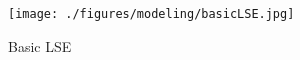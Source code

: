\begin{figure}[ht!]
\texttt{[image: ./figures/modeling/basicLSE.jpg]}
\centering
\caption{Basic LSE}
\label{fig:basicLSE}
\end{figure}
